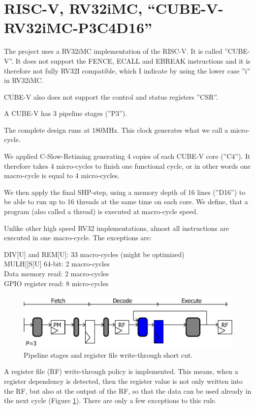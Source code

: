 \section{RISC-V, RV32iMC, “CUBE-V-RV32iMC-P3C4D16”}

The project uses a RV32iMC implementation of the RISC-V. It is called ''CUBE-V''. It does not support the FENCE, ECALL and EBREAK instructions and it is therefore not fully RV32I compatible, which I indicate by using the lower case ''i'' in RV32iMC.

CUBE-V also does not support the control and status registers ''CSR''.

A CUBE-V has 3 pipeline stages (''P3''). 

The complete design runs at 180MHz.  This clock generates what we call a micro-cycle. 

We applied C-Slow-Retiming generating 4 copies of each CUBE-V core (''C4''). It therefore takes 4 micro-cycles to finish one functional cycle, or in other words one macro-cycle is equal to 4 micro-cycles. 

We then apply the final SHP-step, using a memory depth of 16 lines (''D16'') to be able to run up to 16 threads at the same time on each core. We define, that a program (also called a thread) is executed at macro-cycle speed.

Unlike other high speed RV32 implementations, almost all instructions are executed in one macro-cycle. The exceptions are:

DIV[U] and REM[U]: 33 macro-cycles (might be optimized)\\
MULH[[S]U] 64-bit: 2 macro-cycles\\
Data memory read: 2  macro-cycles\\
GPIO register read: 8 micro-cycles\\

\begin{figure}[!t]
	\centering
	\includegraphics[width=6in]{figs/writethrough}
	\caption{Pipeline stages and register file write-through short cut.}
	\label{writethrough}
\end{figure}

A register file (RF) write-through policy is implemented. This means, when a register dependency is detected, then the register value is not only written into the RF, but also at the output of the RF, so that the data can be used already in the next cycle (Figure \ref{writethrough}). There are only a few exceptions to this rule.

